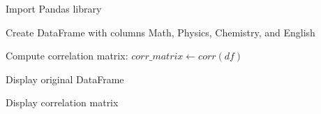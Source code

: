 \begin{algorithm}
\caption{Compute Pairwise Correlation Matrix using Pandas}
\begin{algorithmic}[1]

\STATE Import Pandas library

\STATE Create DataFrame with columns Math, Physics, Chemistry, and English

\STATE Compute correlation matrix:
\STATE $corr\_matrix \gets corr(df)$

\STATE Display original DataFrame

\STATE Display correlation matrix

\end{algorithmic}
\end{algorithm}